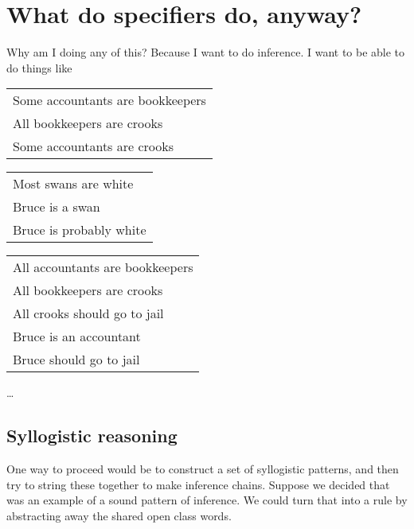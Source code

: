 \documentclass[11pt,a4paper]{article}
\begin{document}
\section{What do specifiers do, anyway?}

Why am I doing any of this? Because I want to do inference. I want to
be able to do things like

\begin{examples}
\item\label{syllogisms}
\begin{examples}
\item
\begin{tabular}{|l|}
\hline
Some accountants are bookkeepers\\
All bookkeepers are crooks\\
\hline
Some accountants are crooks \\
\hline
\end{tabular}

\item
\begin{tabular}{|l|}
\hline
Most swans are white\\
Bruce is a swan\\
\hline
Bruce is probably white \\
\hline
\end{tabular}

\item
\begin{tabular}{|l|}
\hline
All accountants are bookkeepers\\
All bookkeepers are crooks\\
All crooks should go to jail\\
Bruce is an accountant\\
\hline
Bruce should go to jail \\
\hline
\end{tabular}

\item \ldots
\end{examples}
\end{examples}

\subsection{Syllogistic reasoning}

One way to proceed would be to construct a set of syllogistic patterns,
and then try to string these together to make inference
chains. Suppose we decided that  was an example of
a sound pattern of inference. We could turn that into a rule by
abstracting away the shared open class words.
\end{document}
